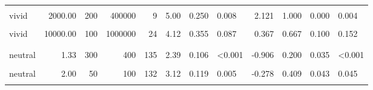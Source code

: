 \documentclass[
]{article}
\begin{document}
\begin{longtable}[t]{lrrrrrrlrrrl}
\hspace{1em}\cellcolor{gray!10}{vivid} & \cellcolor{gray!10}{2000.00} & \cellcolor{gray!10}{20} & \cellcolor{gray!10}{40000} & \cellcolor{gray!10}{24} & \cellcolor{gray!10}{4.58} & \cellcolor{gray!10}{0.313} & \cellcolor{gray!10}{0.004} & \cellcolor{gray!10}{0.722} & \cellcolor{gray!10}{0.792} & \cellcolor{gray!10}{0.087} & \cellcolor{gray!10}{0.007}\\
\hspace{1em}vivid & 2000.00 & 200 & 400000 & 9 & 5.00 & 0.250 & 0.008 & 2.121 & 1.000 & 0.000 & 0.004\\
\hspace{1em}\cellcolor{gray!10}{vivid} & \cellcolor{gray!10}{10000.00} & \cellcolor{gray!10}{30} & \cellcolor{gray!10}{300000} & \cellcolor{gray!10}{9} & \cellcolor{gray!10}{5.11} & \cellcolor{gray!10}{0.328} & \cellcolor{gray!10}{0.008} & \cellcolor{gray!10}{1.736} & \cellcolor{gray!10}{1.000} & \cellcolor{gray!10}{0.000} & \cellcolor{gray!10}{0.004}\\
\hspace{1em}vivid & 10000.00 & 100 & 1000000 & 24 & 4.12 & 0.355 & 0.087 & 0.367 & 0.667 & 0.100 & 0.152\\
\addlinespace[0.3em]
\multicolumn{12}{l}{\textbf{Exp. 6}}\\
\hspace{1em}\cellcolor{gray!10}{neutral} & \cellcolor{gray!10}{1.33} & \cellcolor{gray!10}{30} & \cellcolor{gray!10}{40} & \cellcolor{gray!10}{132} & \cellcolor{gray!10}{2.46} & \cellcolor{gray!10}{0.106} & \cellcolor{gray!10}{<0.001} & \cellcolor{gray!10}{-0.855} & \cellcolor{gray!10}{0.182} & \cellcolor{gray!10}{0.034} & \cellcolor{gray!10}{<0.001}\\
\hspace{1em}neutral & 1.33 & 300 & 400 & 135 & 2.39 & 0.106 & <0.001 & -0.906 & 0.200 & 0.035 & <0.001\\
\hspace{1em}\cellcolor{gray!10}{neutral} & \cellcolor{gray!10}{2.00} & \cellcolor{gray!10}{20} & \cellcolor{gray!10}{40} & \cellcolor{gray!10}{135} & \cellcolor{gray!10}{2.92} & \cellcolor{gray!10}{0.119} & \cellcolor{gray!10}{<0.001} & \cellcolor{gray!10}{-0.422} & \cellcolor{gray!10}{0.348} & \cellcolor{gray!10}{0.041} & \cellcolor{gray!10}{<0.001}\\
\hspace{1em}neutral & 2.00 & 50 & 100 & 132 & 3.12 & 0.119 & 0.005 & -0.278 & 0.409 & 0.043 & 0.045\\
\hspace{1em}\cellcolor{gray!10}{neutral} & \cellcolor{gray!10}{3.00} & \cellcolor{gray!10}{10} & \cellcolor{gray!10}{30} & \cellcolor{gray!10}{135} & \cellcolor{gray!10}{2.98} & \cellcolor{gray!10}{0.112} & \cellcolor{gray!10}{<0.001} & \cellcolor{gray!10}{-0.396} & \cellcolor{gray!10}{0.341} & \cellcolor{gray!10}{0.041} & \cellcolor{gray!10}{<0.001}\\

\end{longtable}
\end{document}
